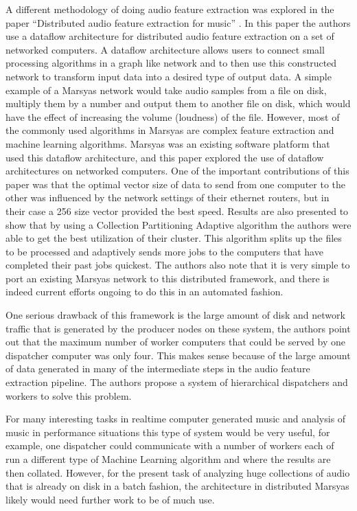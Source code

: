 A different methodology of doing audio feature extraction was explored
in the paper ``Distributed audio feature extraction for music''
\cite{bray05}.  In this paper the authors use a dataflow architecture
for distributed audio feature extraction on a set of networked
computers.  A dataflow architecture allows users to connect small
processing algorithms in a graph like network and to then use this
constructed network to transform input data into a desired type of
output data.  A simple example of a Marsyas network would take audio
samples from a file on disk, multiply them by a number and output them
to another file on disk, which would have the effect of increasing the
volume (loudness) of the file.  However, most of the commonly used
algorithms in Marsyas are complex feature extraction and machine
learning algorithms.  Marsyas was an existing software platform that
used this dataflow architecture, and this paper explored the use of
dataflow architectures on networked computers.  One of the important
contributions of this paper was that the optimal vector size of data
to send from one computer to the other was influenced by the network
settings of their ethernet routers, but in their case a 256 size
vector provided the best speed.  Results are also presented to show
that by using a Collection Partitioning Adaptive algorithm the authors
were able to get the best utilization of their cluster.  This
algorithm splits up the files to be processed and adaptively sends
more jobs to the computers that have completed their past jobs
quickest.  The authors also note that it is very simple to port an
existing Marsyas network to this distributed framework, and there is
indeed current efforts ongoing to do this in an automated fashion.

One serious drawback of this framework is the large amount of disk and
network traffic that is generated by the producer nodes on these
system, the authors point out that the maximum number of worker
computers that could be served by one dispatcher computer was only
four.  This makes sense because of the large amount of data generated
in many of the intermediate steps in the audio feature extraction
pipeline.  The authors propose a system of hierarchical dispatchers
and workers to solve this problem.

For many interesting tasks in realtime computer generated music and
analysis of music in performance situations this type of system would
be very useful, for example, one dispatcher could communicate with a
number of workers each of run a different type of Machine Learning
algorithm and where the results are then collated.  However, for the
present task of analyzing huge collections of audio that is already on
disk in a batch fashion, the architecture in distributed Marsyas
likely would need further work to be of much use.

